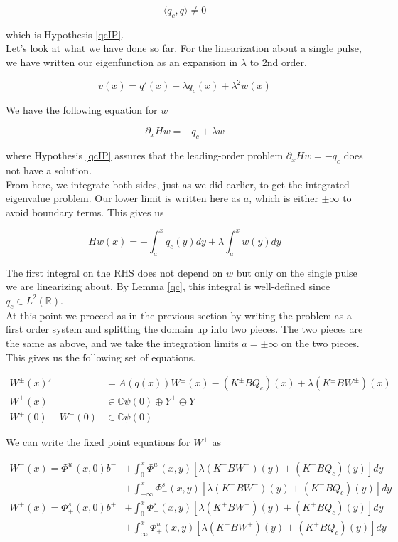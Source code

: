 \documentclass[12pt]{article}
\def\R{{\mathbb R}}
\def\C{{\mathbb C}}
\begin{document}
\[
\langle q_c, q \rangle \neq 0
\]

which is Hypothesis \ref{qcIP}.\\

Let's look at what we have done so far. For the linearization about a single pulse, we have written our eigenfunction as an expansion in $\lambda$ to 2nd order.

\begin{equation}\label{eigenfntosecondorder}
v(x) = q'(x) - \lambda q_c(x) + \lambda^2 w(x)
\end{equation}

We have the following equation for $w$

\[
\partial_x H w = -q_c + \lambda w 
\]

where Hypothesis \ref{qcIP} assures that the leading-order problem $\partial_x H w = -q_c$ does not have a solution.\\

From here, we integrate both sides, just as we did earlier, to get the integrated eigenvalue problem. Our lower limit is written here as $a$, which is either $\pm \infty$ to avoid boundary terms. This gives us

\[
H w(x) = -\int_a^x q_c(y) dy + \lambda \int_a^x w(y) dy 
\]

The first integral on the RHS does not depend on $w$ but only on the single pulse we are linearizing about. By Lemma \ref{qc}, this integral is well-defined since $q_c \in L^2(\R)$. \\

At this point we proceed as in the previous section by writing the problem as a first order system and splitting the domain up into two pieces. The two pieces are the same as above, and we take the integration limits $a = \pm \infty$ on the two pieces. This gives us the following set of equations.

\begin{align*}
W^\pm(x)' &= A(q(x)) W^\pm(x) - (K^\pm B Q_c)(x) + \lambda (K^\pm B W^\pm)(x) \\
W^\pm(x) &\in \C \psi(0) \oplus Y^+ \oplus Y^- \\
W^+(0) - W^-(0) &\in \C \psi(0) 
\end{align*}

We can write the fixed point equations for $W^\pm$ as

\begin{align*}
W^-(x) = \Phi^u_-(x, 0)b^- &+ \int_0^x \Phi^u_-(x, y)[\lambda (K^- B W^-)(y) + (K^- B Q_c)(y) ] dy \\
&+ \int_{-\infty}^x \Phi^s_-(x, y)[\lambda (K^- B W^-)(y) + (K^- B Q_c)(y) ] dy \\
W^+(x) = \Phi^s_+(x, 0)b^+ &+ \int_0^x \Phi^s_+(x, y)[\lambda (K^+ B W^+)(y) + (K^+ B Q_c)(y) ] dy \\
&+ \int_{\infty}^x \Phi^u_+(x, y)[\lambda (K^+ B W^+)(y) + (K^+ B Q_c)(y) ] dy
\end{align*}
\end{document}
